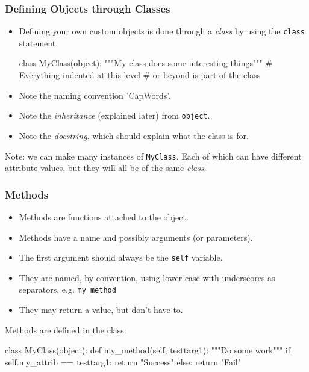 \documentclass{beamer}
\begin{document}
\begin{frame}[fragile]
\frametitle{Defining Objects through Classes}
\begin{itemize}
\item Defining your own custom objects is done through a \emph{class}
by using the \lstinline|class| statement.
\begin{code}
class MyClass(object):
  """My class does some interesting things"""
  # Everything indented at this level 
  # or beyond is part of the class
\end{code}
\item Note the naming convention 'CapWords'.
\item Note the \emph{inheritance} (explained later) from \lstinline|object|.
\item Note the \emph{docstring}, which should explain what the class is for.
\end{itemize}
Note: we can make many instances of \lstinline|MyClass|. 
Each of which can have different attribute values,
but they will all be of the same \emph{class}.

\end{frame}

\begin{frame}[fragile]
\frametitle{Methods}
\begin{itemize}
\item Methods are functions attached to the object.
\item Methods have a name and possibly arguments (or parameters).
\item The first argument should always be the \lstinline|self| variable.
\item They are named, by convention, using lower case with underscores as separators, 
e.g. \lstinline|my_method|
\item They may return a value, but don't have to.
\end{itemize}
Methods are defined in the class:
\begin{code}
class MyClass(object):
  def my_method(self, testtarg1):
    """Do some work"""
    if self.my_attrib == testtarg1:
    	return "Success"
    else:
    	return "Fail"
\end{code}

\end{frame}
\end{document}
